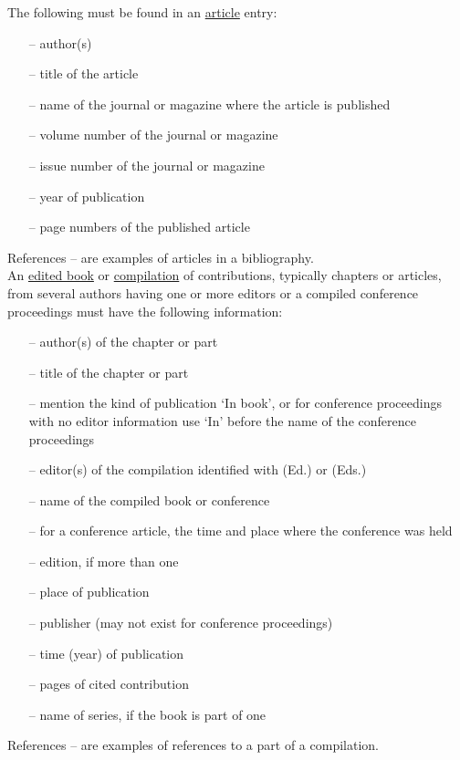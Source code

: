 \documentclass[english, 12pt, a4paper, elec, utf8, a-2b, online]{aaltothesis}
\begin{document}
\noindent
The following must be found in an \underline{article} entry:
\begin{itemize}
	\setlength{\itemsep}{-3pt}
\item[--]author(s)
\item[--]title of the article
\item[--]name of the journal or magazine where the article is published
\item[--]volume number of the journal or magazine
\item[--]issue number of the journal or magazine
\item[--]year of publication
\item[--]page numbers of the published article
\end{itemize}
References \cite{bcs}--\cite{Deschamps} are examples of articles in a 
bibliography.\\

\noindent
An \underline{edited book} or \underline{compilation} of contributions, 
typically chapters or articles, from several authors having one or more editors 
or a compiled conference proceedings must have the following information:
\begin{itemize}
\setlength{\itemsep}{-3pt}
\item[--]author(s) of the chapter or part
\item[--]title of the chapter or part
\item[--]mention the kind of publication `In book', or for conference 
proceedings with no editor information use `In' before the name of the 
conference proceedings
\item[--]editor(s) of the compilation identified with (Ed.) or (Eds.)
\item[--]name of the compiled book or conference
\item[--]for a conference article, the time and place where the conference was 
held
\item[--]edition, if more than one
\item[--]place of publication
\item[--]publisher (may not exist for conference proceedings)
\item[--]time (year) of publication
\item[--]pages of cited contribution
\item[--]name of series, if the book is part of one
\end{itemize}
References \cite{Sihvola}--\cite{Lindblom} are examples of references to a part 
of a compilation.\\
\end{document}
